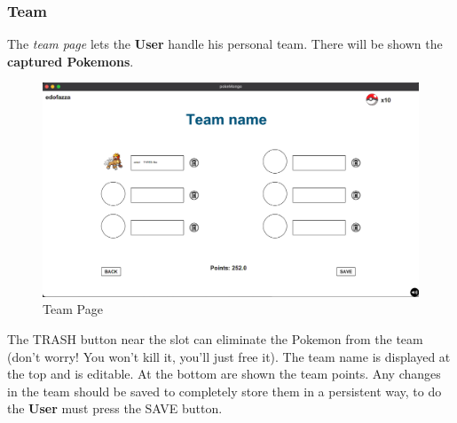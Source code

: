 \subsubsection{Team}
The \textit{team page} lets the \textbf{User} handle his personal team.
There will be shown the \textbf{captured Pokemons}. 
\begin{figure}[H]
	\centering
	\includegraphics[width=\textwidth]{img/userManual/team.png}
	\caption{Team Page}
\end{figure}
The TRASH button near the slot can eliminate the Pokemon from the team (don’t worry! You won’t kill it, you’ll just free it). The team name is displayed at the top and is editable. At the bottom are shown the team points. Any changes in the team should be saved to completely store them in a persistent way, to do the \textbf{User} must press the SAVE button.
